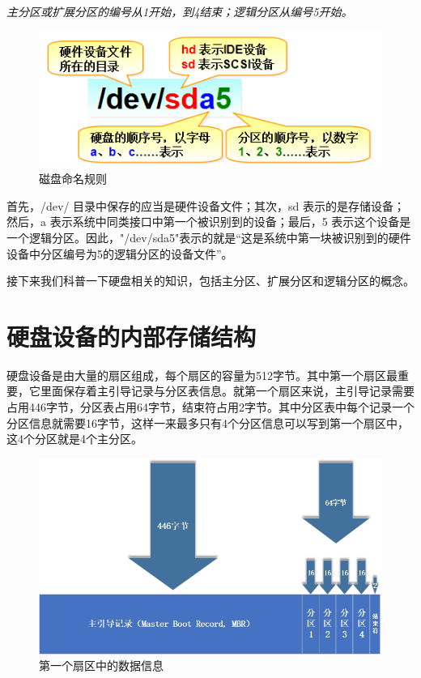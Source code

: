 \documentclass[UTF8]{article}
\begin{document}
	\emph{主分区或扩展分区的编号从1开始，到4结束；逻辑分区从编号5开始。}
	
	\begin{figure}[H]
		\centering
		\includegraphics{Hard_disk_naming_convention.png}
		\caption{磁盘命名规则}
	\end{figure}
	
	首先，/dev/ 目录中保存的应当是硬件设备文件；其次，sd 表示的是存储设备；然后，a 表示系统中同类接口中第一个被识别到的设备；最后，5 表示这个设备是一个逻辑分区。因此，"/dev/sda5"表示的就是“这是系统中第一块被识别到的硬件设备中分区编号为5的逻辑分区的设备文件”。
	
	接下来我们科普一下硬盘相关的知识，包括主分区、扩展分区和逻辑分区的概念。
	
	\section{硬盘设备的内部存储结构}
	
	硬盘设备是由大量的扇区组成，每个扇区的容量为512字节。其中第一个扇区最重要，它里面保存着主引导记录与分区表信息。就第一个扇区来说，主引导记录需要占用446字节，分区表占用64字节，结束符占用2字节。其中分区表中每个记录一个分区信息就需要16字节，这样一来最多只有4个分区信息可以写到第一个扇区中，这4个分区就是4个主分区。
	
	\begin{figure}[htbp]
		\centering
		\includegraphics[scale=0.5]{first_sector.jpg}
		\caption{第一个扇区中的数据信息}
	\end{figure}
	
\end{document}
